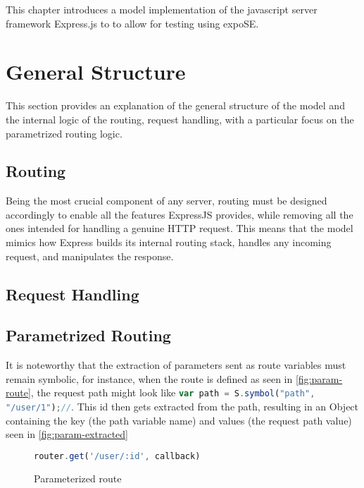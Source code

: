 This chapter introduces a model implementation of the javascript server framework Express.js to to allow for testing using expoSE. 

\section{General Structure}

This section provides an explanation of the general structure of the model and the internal logic of the routing, request handling, with a particular focus on the parametrized routing logic. 

\subsection{Routing} 

Being the most crucial component of any server, routing must be designed accordingly to enable all the features ExpressJS provides, while removing all the ones intended for handling a genuine HTTP request. This means that the model mimics how Express builds its internal routing stack, handles any incoming request, and manipulates the response.  


\subsection{Request Handling}
\subsection{Parametrized Routing}
It is noteworthy that the extraction of parameters sent as route variables must remain symbolic, for instance, when the route is defined as seen in \autoref{fig:param-route}, the request path might look like \lstinline[language=JavaScript, gobble=4]{var path = S.symbol("path", "/user/1");//}. This id then gets extracted from the path, resulting in an Object containing the key (the path variable name) and values (the request path value) seen in \autoref{fig:param-extracted}

\begin{figure}[ht]
    \begin{lstlisting}[language=JavaScript, gobble=4]
    router.get('/user/:id', callback) 
    \end{lstlisting}
    \caption{Parameterized route}
    \label{fig:param-route}
\end{figure}




